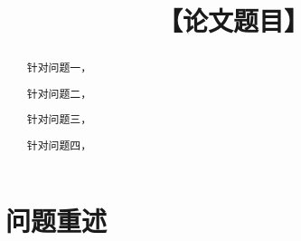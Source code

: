 \documentclass[bwprint]{gmcmthesis}
\title{【论文题目】}
\numberwithin{equation}{section}
\numberwithin{figure}{section}
\numberwithin{table}{section}
\begin{document}
\maketitle

%
%
%

\begin{abstract}


针对问题一，

针对问题二，

针对问题三，

针对问题四，



\end{abstract}

\pagestyle{plain}

\maketoc

\clearpage

\section{问题重述}
\end{document}
